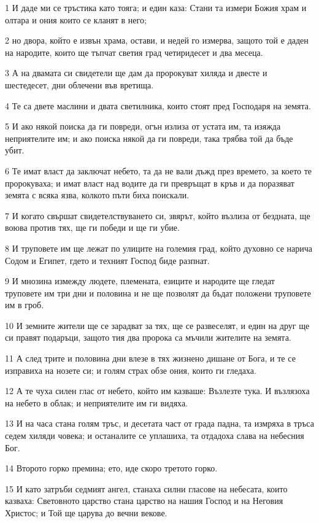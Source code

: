\par 1 И даде ми се тръстика като тояга; и един каза: Стани та измери Божия храм и олтара и ония които се кланят в него;
\par 2 но двора, който е извън храма, остави, и недей го измерва, защото той е даден на народите, които ще тъпчат светия град четиридесет и два месеца.
\par 3 А на двамата си свидетели ще дам да пророкуват хиляда и двесте и шестедесет, дни облечени във вретища.
\par 4 Те са двете маслини и двата светилника, които стоят пред Господаря на земята.
\par 5 И ако някой поиска да ги повреди, огън излиза от устата им, та изяжда неприятелите им; и ако поиска някой да ги повреди, така трябва той да бъде убит.
\par 6 Те имат власт да заключат небето, та да не вали дъжд през времето, за което те пророкуваха; и имат власт над водите да ги превръщат в кръв и да поразяват земята с всяка язва, колкото пъти биха поискали.
\par 7 И когато свършат свидетелствуването си, звярът, който възлиза от бездната, ще воюва против тях, ще ги победи и ще ги убие.
\par 8 И труповете им ще лежат по улиците на големия град, който духовно се нарича Содом и Египет, гдето и техният Господ биде разпнат.
\par 9 И мнозина измежду людете, племената, езиците и народите ще гледат труповете им три дни и половина и не ще позволят да бъдат положени труповете им в гроб.
\par 10 И земните жители ще се зарадват за тях, ще се развеселят, и един на друг ще си правят подаръци, защото тия два пророка са мъчили жителите на земята.
\par 11 А след трите и половина дни влезе в тях жизнено дишане от Бога, и те се изправиха на нозете си; и голям страх обзе ония, които ги гледаха.
\par 12 А те чуха силен глас от небето, който им казваше: Възлезте тука. И възлязоха на небето в облак; и неприятелите им ги видяха.
\par 13 И на часа стана голям тръс, и десетата част от града падна, та измряха в тръса седем хиляди човека; и останалите се уплашиха, та отдадоха слава на небесния Бог.
\par 14 Второто горко премина; ето, иде скоро третото горко.
\par 15 И като затръби седмият ангел, станаха силни гласове на небесата, които казваха: Световното царство стана царство на нашия Господ и на Неговия Христос; и Той ще царува до вечни векове.
